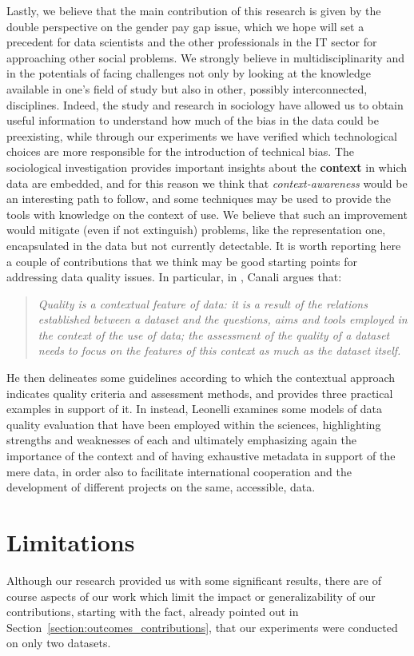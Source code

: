 Lastly, we believe that the main contribution of this research is given by the double perspective on the gender pay gap issue, which we hope will set a precedent for data scientists and the other professionals in the IT sector for approaching other social problems. We strongly believe in multidisciplinarity and in the potentials of facing challenges not only by looking at the knowledge available in one's field of study but also in other, possibly interconnected, disciplines. Indeed, the study and research in sociology have allowed us to obtain useful information to understand how much of the bias in the data could be preexisting, while through our experiments we have verified which technological choices are more responsible for the introduction of technical bias. The sociological investigation provides important insights about the \textbf{context} in which data are embedded, and for this reason we think that \textit{context-awareness} would be an interesting path to follow, and some techniques may be used to provide the tools with knowledge on the context of use. We believe that such an improvement would mitigate (even if not extinguish) problems, like the representation one, encapsulated in the data but not currently detectable. It is worth reporting here a couple of contributions that we think may be good starting points for addressing data quality issues. In particular, in \cite{canali2020towards}, Canali argues that:
\begin{quote}\emph{Quality is a contextual feature of data: it is a result of the relations established between a dataset and the questions, aims and tools employed in the context of the use of data; the assessment of the quality of a dataset needs to focus on the features of this context as much as the dataset itself.} \cite[p.~4]{canali2020towards}\end{quote}
He then delineates some guidelines according to which the contextual approach indicates quality criteria and assessment methods, and provides three practical examples in support of it. In \cite{leonelli2017global} instead, Leonelli examines some models of data quality evaluation that have been employed within the sciences, highlighting strengths and weaknesses of each and ultimately emphasizing again the importance of the context and of having exhaustive metadata in support of the mere data, in order also to facilitate international cooperation and the development of different projects on the same, accessible, data.


\section{Limitations}
\label{section:limitations}
Although our research provided us with some significant results, there are of course aspects of our work which limit the impact or generalizability of our contributions, starting with the fact, already pointed out in Section~\ref{section:outcomes_contributions}, that our experiments were conducted on only two datasets.

